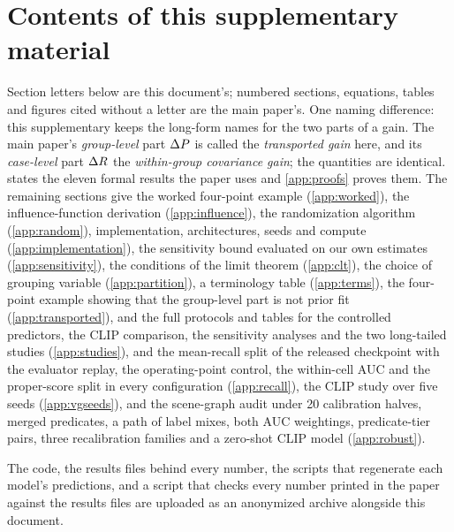 \section{Contents of this supplementary material}\label{app:overview}

Section letters below are this document's; numbered sections, equations, tables and figures
cited without a letter are the main paper's. One naming difference: this supplementary keeps
the long-form names for the two parts of a gain. The main paper's \emph{group-level} part
$\Delta P$ is called the \emph{transported gain} here, and its \emph{case-level} part $\Delta R$ the
\emph{within-group covariance gain}; the quantities are identical.  states the eleven formal results
the paper uses and \cref{app:proofs} proves them. The remaining sections give the worked
four-point example (\cref{app:worked}), the influence-function derivation
(\cref{app:influence}), the randomization algorithm (\cref{app:random}), implementation,
architectures, seeds and compute (\cref{app:implementation}), the sensitivity bound evaluated
on our own estimates (\cref{app:sensitivity}), the conditions of the limit theorem
(\cref{app:clt}), the choice of grouping variable (\cref{app:partition}), a terminology table
(\cref{app:terms}), the four-point example showing that the group-level part is not prior
fit (\cref{app:transported}), and the full protocols and tables for the controlled
predictors, the CLIP comparison, the sensitivity analyses and the two long-tailed studies
(\cref{app:studies}), and the mean-recall split of the released checkpoint with the
evaluator replay, the operating-point control, the within-cell AUC and the proper-score split
in every configuration (\cref{app:recall}), the CLIP study over five seeds (\cref{app:vgseeds}),
and the scene-graph audit under 20 calibration halves, merged predicates, a path of label
mixes, both AUC weightings, predicate-tier pairs, three recalibration families and a zero-shot
CLIP model (\cref{app:robust}).

The code, the results files behind every number, the scripts that regenerate each model's
predictions, and a script that checks every number printed in the paper against the results
files are uploaded as an anonymized archive alongside this document.
